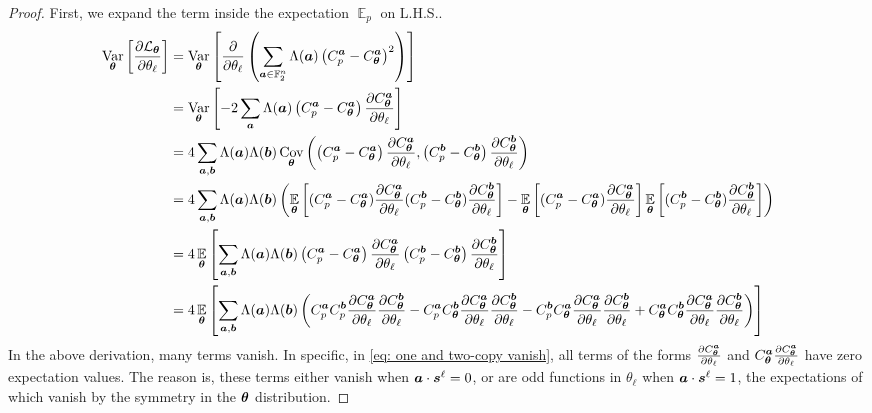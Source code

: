 \documentclass{article}
\theoremstyle{plain}
\theoremstyle{definition}
\theoremstyle{remark}
\begin{document}
\begin{proof}
First, we expand the term inside the expectation $\operatorname*{\mathbb{E}}_p$ on L.H.S..
\begin{align}
    \operatorname*{Var}_{{\bm{\theta}}} \left[ \frac{\partial \mathcal{L}_{\bm{\theta}}}{\partial \theta_\ell} \right] &=    \operatorname*{Var}_{{\bm{\theta}}} \left[ \frac{\partial }{\partial \theta_\ell}  \left(\sum_{{\bm{a}} \in \mathbb{F}_2^n} \Lambda({\bm{a}})\left(C^{\bm{a}}_p - C^{\bm{a}}_{\bm{\theta}} \right)^2\right)\right]
\\ &= \operatorname*{Var}_{{\bm{\theta}}} \left[-2 \sum_{\bm{a}} \Lambda({\bm{a}}) \left(C^{\bm{a}}_p - C^{\bm{a}}_{\bm{\theta}} \right) \frac{\partial C^{\bm{a}}_{\bm{\theta}}}{\partial \theta_\ell} \right] \\
&= 4 \sum_{{\bm{a}}, {\bm{b}}} \Lambda({\bm{a}}) \Lambda({\bm{b}}) \operatorname*{Cov}_{{\bm{\theta}}}\left(\left(C^{\bm{a}}_p - C^{\bm{a}}_{\bm{\theta}}\right) \frac{\partial C^{\bm{a}}_{\bm{\theta}}}{\partial \theta_\ell} , \left(C^{\bm{b}}_p - C^{\bm{b}}_{\bm{\theta}}\right) \frac{\partial C^{\bm{b}}_{\bm{\theta}}}{\partial \theta_\ell} \right) \\
&= 4 \sum_{{\bm{a}}, {\bm{b}}} \Lambda({\bm{a}}) \Lambda({\bm{b}}) \left(\operatorname*{\mathbb{E}}_{{\bm{\theta}}} \left[ (C^{\bm{a}}_p - C^{\bm{a}}_{\bm{\theta}}) \frac{\partial C^{\bm{a}}_{\bm{\theta}}}{\partial \theta_\ell} (C^{\bm{b}}_p - C^{\bm{b}}_{\bm{\theta}}) \frac{\partial C^{\bm{b}}_{\bm{\theta}}}{\partial \theta_\ell} \right] - \operatorname*{\mathbb{E}}_{{\bm{\theta}}}\left[(C^{\bm{a}}_p - C^{\bm{a}}_{\bm{\theta}}) \frac{\partial C^{\bm{a}}_{\bm{\theta}}}{\partial \theta_\ell} \right] \operatorname*{\mathbb{E}}_{{\bm{\theta}}}\left[(C^{\bm{b}}_p - C^{\bm{b}}_{\bm{\theta}}) \frac{\partial C^{\bm{b}}_{\bm{\theta}}}{\partial \theta_\ell} \right] \right) \label{eq: one and two-copy vanish} \\
&= 4 \operatorname*{\mathbb{E}}_{{\bm{\theta}}} \left[\sum_{{\bm{a}}, {\bm{b}}} \Lambda({\bm{a}}) \Lambda({\bm{b}})  \left( C^{\bm{a}}_p - C^{\bm{a}}_{\bm{\theta}} \right) \frac{\partial C^{\bm{a}}_{\bm{\theta}}}{\partial \theta_\ell} \left(C^{\bm{b}}_p - C^{\bm{b}}_{\bm{\theta}}\right) \frac{\partial C^{\bm{b}}_{\bm{\theta}}}{\partial \theta_\ell} \right] \\
&= 4 \operatorname*{\mathbb{E}}_{{\bm{\theta}}} \left[ \sum_{{\bm{a}}, {\bm{b}}} \Lambda({\bm{a}}) \Lambda({\bm{b}}) \left( C^{\bm{a}}_p C^{\bm{b}}_p \frac{\partial C_{\bm{\theta}}^{\bm{a}}}{\partial \theta_\ell} \frac{\partial C_{\bm{\theta}}^{\bm{b}}}{\partial \theta_\ell} - C^{\bm{a}}_p C_{\bm{\theta}}^{\bm{b}} \frac{\partial C_{\bm{\theta}}^{\bm{a}}}{\partial \theta_\ell} \frac{\partial C_{\bm{\theta}}^{\bm{b}}}{\partial \theta_\ell} - C^{\bm{b}}_p C_{\bm{\theta}}^{\bm{a}} \frac{\partial C_{\bm{\theta}}^{\bm{a}}}{\partial \theta_\ell} \frac{\partial C_{\bm{\theta}}^{\bm{b}}}{\partial \theta_\ell} + C_{\bm{\theta}}^{\bm{a}} C_{\bm{\theta}}^{\bm{b}} \frac{\partial C_{\bm{\theta}}^{\bm{a}}}{\partial \theta_\ell} \frac{\partial C_{\bm{\theta}}^{\bm{b}}}{\partial \theta_\ell} \right)\right] \label{eq: two three four copies}
\end{align}
In the above derivation, many terms vanish. In specific, in \cref{eq: one and two-copy vanish}, all terms of the forms $\frac{\partial C_{\bm{\theta}}^{\bm{a}}}{\partial \theta_\ell} $ and $C^{\bm{a}}_{\bm{\theta}}\frac{\partial C_{\bm{\theta}}^{\bm{a}}}{\partial \theta_\ell}$ have zero expectation values. The reason is, these terms either vanish when ${\bm{a}} \cdot{\bm{s}^\ell} =0$, or are odd functions in $\theta_\ell$ when ${\bm{a}} \cdot{\bm{s}^\ell} =1$, the expectations of which vanish by the symmetry in the ${\bm{\theta}}$ distribution.


\end{proof}
\end{document}
